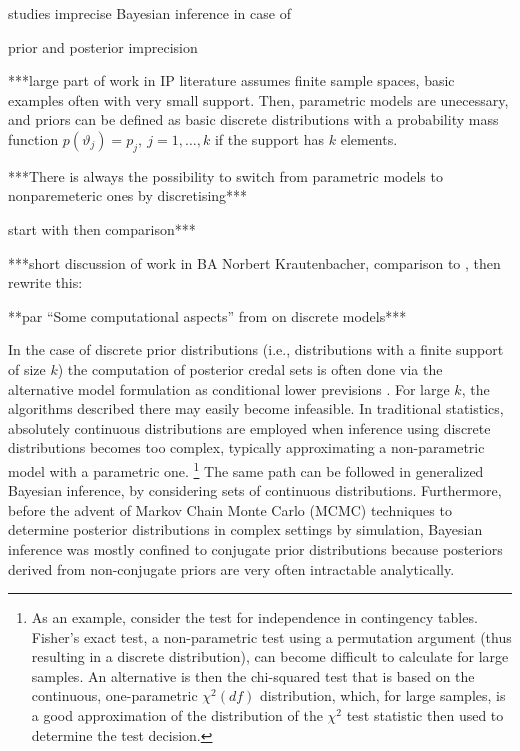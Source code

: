 \medskip

\parencite{2005:whitcomb} studies imprecise Bayesian inference in case of

prior and posterior imprecision



***large part of work in IP literature assumes finite sample spaces,
basic examples often with very small support. Then, parametric models are unecessary,
and priors can be defined as basic discrete distributions with a probability mass function
$p(\vartheta_j) = p_j,\ j=1,\ldots,k$ if the support has $k$ elements.

***There is always the possibility to switch from parametric models to nonparemeteric ones
by discretising***


start with \parencite{2005:whitcomb} then comparison***

***short discussion of work in \textcite{2011:krautenbacher} BA Norbert Krautenbacher,
comparison to \parencite{2005:whitcomb}, then rewrite this:

**par ``Some computational aspects'' from \textcite[\S 4.2]{itip-statinf} on discrete models***

In the case of discrete prior distributions (i.e., distributions with a finite support of size $k$)
the computation of posterior credal sets is often done
via the alternative model formulation as conditional lower previsions
\parencite[see, e.g.,][]{itip-computation}.
For large $k$, the algorithms described there may easily become infeasible.
In traditional statistics, absolutely continuous distributions are employed
when inference using discrete distributions becomes too complex,
typically approximating a non-parametric model with a parametric one.%
\footnote{As an example, consider the test for independence in contingency tables.
Fisher's exact test, a non-parametric test using a permutation argument (thus resulting in a discrete distribution),
can become difficult to calculate for large samples.
An alternative is then the chi-squared test that is based on the continuous, one-parametric $\chi^2(df)$ distribution,
which, for large samples, is a good approximation of the distribution of the $\chi^2$ test statistic then used to determine the test decision.}
The same path can be followed in generalized Bayesian inference,
by considering sets of continuous distributions.
Furthermore, before the advent of Markov Chain Monte Carlo (MCMC) techniques \parencite[see, e.g.,][]{1998:gilks}
to determine posterior distributions in complex settings by simulation,
Bayesian inference was mostly confined to conjugate prior distributions
because posteriors derived from non-conjugate priors are very often intractable analytically.




